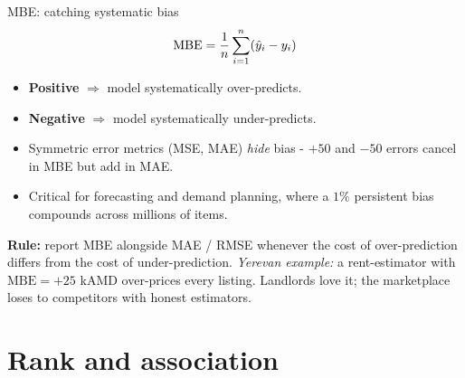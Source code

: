 \documentclass[aspectratio=169]{beamer}
\begin{document}
\begin{frame}{MBE: catching systematic bias}
  \[
    \text{MBE} = \frac{1}{n} \sum_{i=1}^n (\hat{y}_i - y_i)
  \]
  \vfill
  \begin{itemize}
    \item \textbf{Positive} $\Rightarrow$ model systematically over-predicts.
    \item \textbf{Negative} $\Rightarrow$ model systematically under-predicts.
    \item Symmetric error metrics (MSE, MAE) \emph{hide} bias - $+50$ and $-50$ errors cancel in MBE but add in MAE.
    \item Critical for forecasting and demand planning, where a $1\%$ persistent bias compounds across millions of items.
  \end{itemize}
  \vfill
  \textbf{Rule:} report MBE alongside MAE / RMSE whenever the cost of over-prediction differs from the cost of under-prediction.
  \vfill
  \footnotesize \emph{Yerevan example:} a rent-estimator with $\text{MBE} = +25$ kAMD over-prices every listing. Landlords love it; the marketplace loses to competitors with honest estimators.
\end{frame}

\section{Rank and association}
\end{document}
